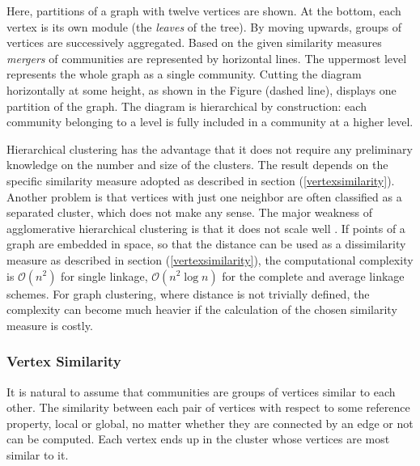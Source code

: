 {Here, partitions of a graph with twelve vertices are shown. At the bottom, each vertex is its own module (the \textit{leaves} of the tree). By moving upwards, groups of vertices are successively aggregated. Based on the  given similarity measures \textit{mergers} of communities are represented by horizontal lines. The uppermost level represents the whole graph as a single community. Cutting the diagram horizontally at some height, as shown in the Figure (dashed line), displays one partition of the graph. The diagram is hierarchical by construction: each community belonging to a level is fully included in a community at a higher level.

Hierarchical clustering has the advantage that it does not require any preliminary knowledge on the number and size of the clusters. The result depends on the specific similarity measure adopted as described in section (\ref{vertexsimilarity}). Another problem is that vertices with just one neighbor are often classified as a separated cluster, which does not make any sense. The major weakness of agglomerative hierarchical clustering is that it does not scale well \cite{ref-6}. If points of a graph are embedded in space, so that the distance can be used as a dissimilarity measure as described in section (\ref{vertexsimilarity}), the computational complexity is $\mathcal{O}(n^2)$ for single linkage, $\mathcal{O}(n^2 \log n)$ for the complete and average linkage schemes. For graph clustering, where distance is not trivially defined, the complexity can become much heavier if the calculation of the chosen similarity measure is costly.

\subsubsection*{Vertex Similarity}\label{vertexsimilarity}
It is natural to assume that communities are groups of vertices similar to each other. The similarity between each pair of vertices with respect to some reference property, local or global, no matter whether they are connected by an edge or not can be computed. Each vertex ends up in the cluster whose vertices are most similar to it.

}
